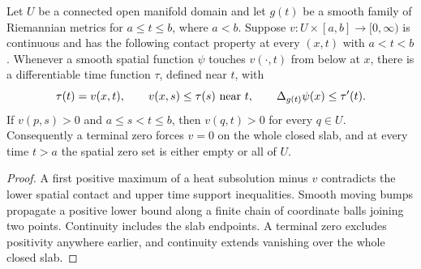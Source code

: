 \begin{lemma}
\label{lem:ancient-heat-contacts}
Let $U$ be a connected open manifold domain and let $g(t)$
be a smooth family of Riemannian metrics for $a\leq t\leq b$,
where $a<b$.  Suppose $v:U\times[a,b]\to[0,\infty)$ is
continuous and has the following contact property at every
$(x,t)$ with $a<t<b$.  Whenever a smooth spatial function
$\psi$ touches $v(\cdot,t)$ from below at $x$, there is a
differentiable time function $\tau$, defined near $t$, with
\[
 \tau(t)=v(x,t),\qquad v(x,s)\leq\tau(s)\ \hbox{near }t,
 \qquad \Delta_{g(t)}\psi(x)\leq\tau'(t).
\]
If $v(p,s)>0$ and $a\leq s<t\leq b$, then $v(q,t)>0$
for every $q\in U$.  Consequently a terminal zero forces
$v=0$ on the whole closed slab, and at every time $t>a$
the spatial zero set is either empty or all of $U$.
\end{lemma}
\begin{proof}
A first positive maximum of a heat subsolution minus $v$ contradicts the lower
spatial contact and upper time support inequalities. Smooth moving bumps
propagate a positive lower bound along a finite chain of coordinate balls
joining two points. Continuity includes the slab endpoints. A terminal zero
excludes positivity anywhere earlier, and continuity extends vanishing over
the whole closed slab.
\end{proof}

